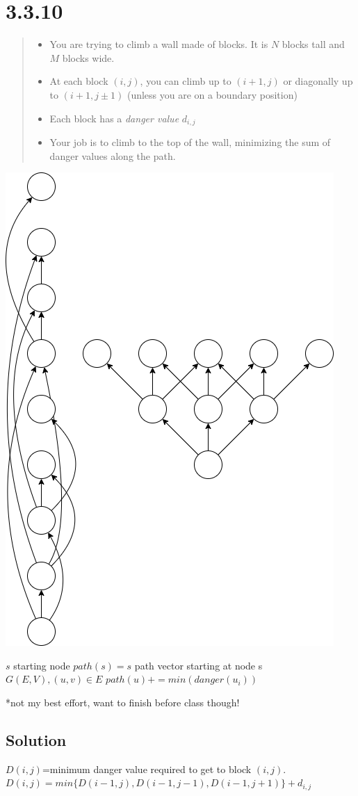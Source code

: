\documentclass[12pt, letterpaper, twoside]{article}
\begin{document}
\section*{3.3.10}
\begin{quote}
  \begin{itemize}
    \item You are trying to climb a wall made of blocks. It is $N$ blocks tall and $M$ blocks wide.
    \item At each block $(i,j)$, you can climb up to $(i+1,j)$ or diagonally up to $(i+1,j\pm{1})$ (unless you are on a boundary position)
    \item Each block has a \emph{danger value} $d_{i,j}$
    \item Your job is to climb to the top of the wall, minimizing the sum of danger values along the path.
  \end{itemize}
\end{quote}
\begin{center}
  \includegraphics[scale=0.5]{6_3_10_dag.drawio.png}
\end{center}
\newpage
\begin{algorithmic}
  \State $s$ starting node
  \State $path(s)=s$ path vector starting at node s
  \State $G(E,V),(u,v)\in{E}$
  \State $path(u)+=min(danger(u_i))$
  \EndFor
\end{algorithmic}
*not my best effort, want to finish before class though!
\subsection*{Solution}
\begin{algorithmic}
  \State $D(i,j)$=minimum danger value required to get to block $(i,j)$.
  \State $D(i,j)=min\{D(i-1,j),D(i-1,j-1),D(i-1,j+1)\}+d_{i,j}$
\end{algorithmic}
\end{document}
